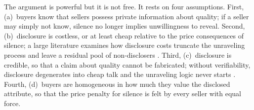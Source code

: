 The argument is powerful but it is not free. It rests on four assumptions. First, (a)~buyers know
that sellers possess private information about quality; if a seller may simply not know, silence
no longer implies unwillingness to reveal. Second, (b)~disclosure is costless, or at least cheap
relative to the price consequences of silence; a large literature examines how disclosure costs
truncate the unraveling process and leave a residual pool of non-disclosers
\citep{verrecchia_1983, jovanovic_1982}. Third, (c)~disclosure is credible, so that a claim about
quality cannot be fabricated; without verifiability, disclosure degenerates into cheap talk and
the unraveling logic never starts \citep{crawford_sobel_1982, stocken_credibility_2000}. Fourth, (d)~buyers are homogeneous in how much they value the
disclosed attribute, so that the price penalty for silence is felt by every seller with equal
force.
